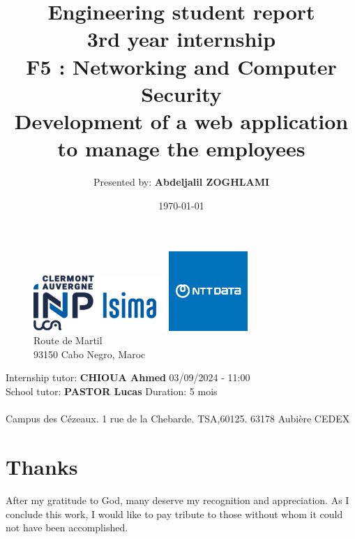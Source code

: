 \documentclass[12pt,a4paper,table,english]{article}
\title{Engineering student report\\
	3rd year internship\\
	F5 : Networking and Computer Security\\
	\textbf{Development of a web application to manage the employees}}
\author{Presented by: \textbf{Abdeljalil ZOGHLAMI}}
\date{\today}
\begin{document}
	\begin{figure}[t]
		\begin{minipage}[t]{0.5\textwidth}
			\centering
			\includegraphics[width=50mm]{Image/Logo_ISIMA_INP.png}
		\end{minipage}%
		\begin{minipage}[t]{0.5\textwidth}
			\centering
			\includegraphics[width=30mm]{Image/Logo_NTT-DATA.png}
			\caption*{Route de Martil\\ 93150 Cabo Negro, Maroc}
		\end{minipage}
	\end{figure}
	
		
	\maketitle
	
	
	\thispagestyle{empty}
	
	\vfill 
	\noindent Internship tutor: \textbf{CHIOUA Ahmed}
	\hfill %
	03/09/2024 - 11:00 \\
	\noindent School tutor: \textbf{PASTOR Lucas}
	\hfill %
	Duration: 5 mois\\
	\vspace{5pt}\\
	\noindent Campus des Cézeaux. 1 rue de la Chebarde. TSA,60125. 63178 Aubière CEDEX
	
	\newpage
	\section{Thanks}
	
	After my gratitude to God, many deserve my recognition and appreciation. As I conclude this work, I would like to pay tribute to those without whom it could not have been accomplished.\\
	
\end{document}
